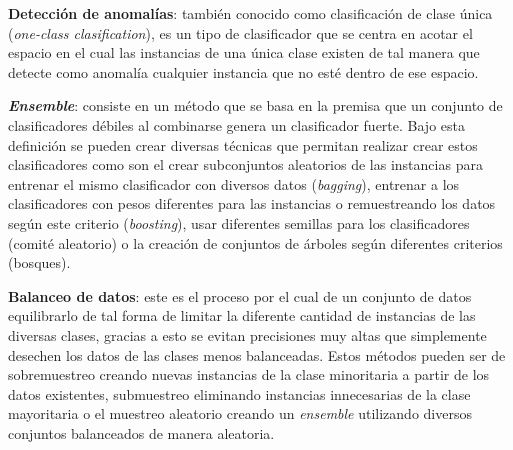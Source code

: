\textbf{Detección de anomalías}: también conocido como clasificación de clase única (\textit{one-class clasification}), es un tipo de clasificador que se centra en acotar el espacio en el cual las instancias de una única clase existen de tal manera que detecte como anomalía cualquier instancia que no esté dentro de ese espacio.~\cite{wiki:ooc}

\textbf{\textit{Ensemble}}: consiste en un método que se basa en la premisa que un conjunto de clasificadores débiles al combinarse genera un clasificador fuerte. Bajo esta definición se pueden crear diversas técnicas que permitan realizar crear estos clasificadores como son el crear subconjuntos aleatorios de las instancias para entrenar el mismo clasificador con diversos datos (\textit{bagging}), entrenar a los clasificadores con pesos diferentes para las instancias o remuestreando los datos según este criterio (\textit{boosting}), usar diferentes semillas para los clasificadores (comité aleatorio) o la creación de conjuntos de árboles según diferentes criterios (bosques).~\cite{ubu:mineria3}

\textbf{Balanceo de datos}: este es el proceso por el cual de un conjunto de datos equilibrarlo de tal forma de limitar la diferente cantidad de instancias de las diversas clases, gracias a esto se evitan precisiones muy altas que simplemente desechen los datos de las clases menos balanceadas. Estos métodos pueden ser de sobremuestreo creando nuevas instancias de la clase minoritaria a partir de los datos existentes, submuestreo eliminando instancias innecesarias de la clase mayoritaria o el muestreo aleatorio creando un \textit{ensemble} utilizando diversos conjuntos balanceados de manera aleatoria.~\cite{diez2015random, diez2015diversity, galar2012review}
